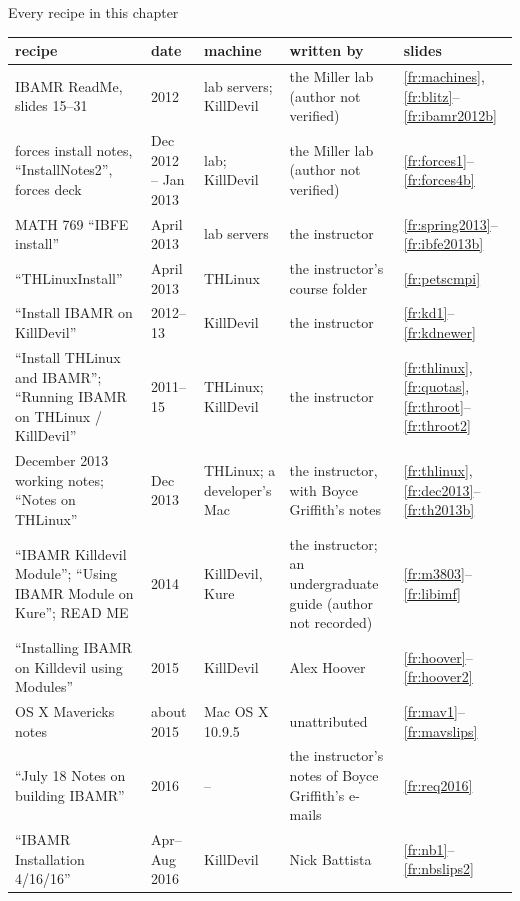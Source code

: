 \documentclass[aspectratio=169,11pt]{beamer}
\begin{document}
\begin{frame}{Every recipe in this chapter}
\label{fr:recipes}
\tiny
\renewcommand{\arraystretch}{1.0}
\setlength{\tabcolsep}{3pt}
\begin{tabular}{@{}L{0.3\textwidth}L{0.12\textwidth}L{0.2\textwidth}L{0.2\textwidth}L{0.1\textwidth}@{}}
\toprule
recipe & date & machine & written by & slides \\
\midrule
IBAMR ReadMe, slides 15--31 & 2012 & lab servers; KillDevil & the Miller lab (author not verified) & \ref{fr:machines}, \ref{fr:blitz}--\ref{fr:ibamr2012b} \\
forces install notes, ``InstallNotes2'', forces deck & Dec 2012 -- Jan 2013 & lab; KillDevil & the Miller lab (author not verified) & \ref{fr:forces1}--\ref{fr:forces4b} \\
MATH 769 ``IBFE install'' & April 2013 & lab servers & the instructor & \ref{fr:spring2013}--\ref{fr:ibfe2013b} \\
``THLinuxInstall'' & April 2013 & THLinux & the instructor's course folder & \ref{fr:petscmpi} \\
``Install IBAMR on KillDevil'' & 2012--13 & KillDevil & the instructor & \ref{fr:kd1}--\ref{fr:kdnewer} \\
``Install THLinux and IBAMR''; ``Running IBAMR on THLinux / KillDevil'' & 2011--15 & THLinux; KillDevil & the instructor & \ref{fr:thlinux}, \ref{fr:quotas}, \ref{fr:throot}--\ref{fr:throot2} \\
December 2013 working notes; ``Notes on THLinux'' & Dec 2013 & THLinux; a developer's Mac & the instructor, with Boyce Griffith's notes & \ref{fr:thlinux}, \ref{fr:dec2013}--\ref{fr:th2013b} \\
``IBAMR Killdevil Module''; ``Using IBAMR Module on Kure''; READ ME & 2014 & KillDevil, Kure & the instructor; an undergraduate guide (author not recorded) & \ref{fr:m3803}--\ref{fr:libimf} \\
``Installing IBAMR on Killdevil using Modules'' & 2015 & KillDevil & Alex Hoover & \ref{fr:hoover}--\ref{fr:hoover2} \\
OS X Mavericks notes & about 2015 & Mac OS X 10.9.5 & unattributed & \ref{fr:mav1}--\ref{fr:mavslips} \\
``July 18 Notes on building IBAMR'' & 2016 & -- & the instructor's notes of Boyce Griffith's e-mails & \ref{fr:req2016} \\
``IBAMR Installation 4/16/16'' & Apr--Aug 2016 & KillDevil & Nick Battista & \ref{fr:nb1}--\ref{fr:nbslips2} \\

\end{tabular}
\end{frame}
\end{document}
